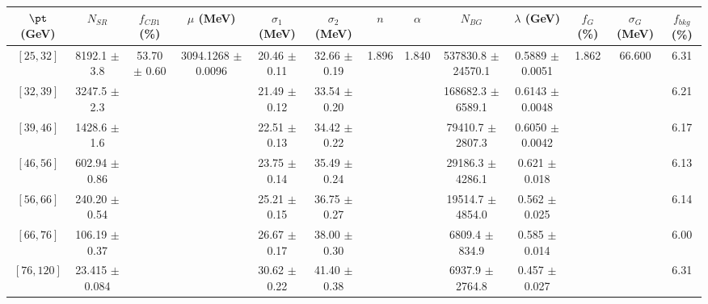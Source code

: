 \begin{tabular}{c||c|c|c|c|c|c|c|c|c|c|c||c}
$\pt$ (GeV) & $N_{SR}$ & $f_{CB1}$ (\%) & $\mu$ (MeV) & $\sigma_1$ (MeV) & $\sigma_2$ (MeV) & $n$ & $\alpha$ & $N_{BG}$ & $\lambda$ (GeV) & $f_G$ (\%) & $\sigma_G$ (MeV) & $f_{bkg}$ (\%) \\
\hline
$[25, 32]$ & 8192.1 $\pm$ 3.8 & \multirow{7}{*}{53.70 $\pm$ 0.60} & \multirow{7}{*}{3094.1268 $\pm$ 0.0096} & 20.46 $\pm$ 0.11 & 32.66 $\pm$ 0.19 & \multirow{7}{*}{1.896} & \multirow{7}{*}{1.840} & 537830.8 $\pm$ 24570.1 & 0.5889 $\pm$ 0.0051 & \multirow{7}{*}{1.862} & \multirow{7}{*}{66.600} & 6.31\\
$[32, 39]$ & 3247.5 $\pm$ 2.3 &  &  & 21.49 $\pm$ 0.12 & 33.54 $\pm$ 0.20 &  &  & 168682.3 $\pm$ 6589.1 & 0.6143 $\pm$ 0.0048 &  &  & 6.21\\
$[39, 46]$ & 1428.6 $\pm$ 1.6 &  &  & 22.51 $\pm$ 0.13 & 34.42 $\pm$ 0.22 &  &  & 79410.7 $\pm$ 2807.3 & 0.6050 $\pm$ 0.0042 &  &  & 6.17\\
$[46, 56]$ & 602.94 $\pm$ 0.86 &  &  & 23.75 $\pm$ 0.14 & 35.49 $\pm$ 0.24 &  &  & 29186.3 $\pm$ 4286.1 & 0.621 $\pm$ 0.018 &  &  & 6.13\\
$[56, 66]$ & 240.20 $\pm$ 0.54 &  &  & 25.21 $\pm$ 0.15 & 36.75 $\pm$ 0.27 &  &  & 19514.7 $\pm$ 4854.0 & 0.562 $\pm$ 0.025 &  &  & 6.14\\
$[66, 76]$ & 106.19 $\pm$ 0.37 &  &  & 26.67 $\pm$ 0.17 & 38.00 $\pm$ 0.30 &  &  & 6809.4 $\pm$ 834.9 & 0.585 $\pm$ 0.014 &  &  & 6.00\\
$[76, 120]$ & 23.415 $\pm$ 0.084 &  &  & 30.62 $\pm$ 0.22 & 41.40 $\pm$ 0.38 &  &  & 6937.9 $\pm$ 2764.8 & 0.457 $\pm$ 0.027 &  &  & 6.31\\
\end{tabular}

